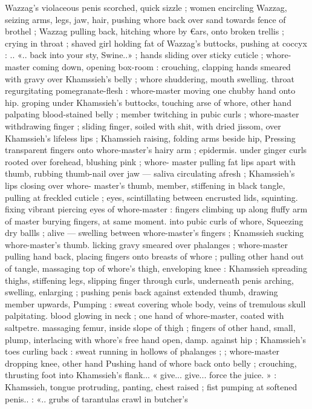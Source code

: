 Wazzag's violaceous penis scorched, quick sizzle ; women encircling
Wazzag, seizing arms, legs, jaw, hair, pushing whore back over sand
towards fence of brothel ; Wazzag pulling back, hitching whore by
€ars, onto broken trellis ; crying in throat ; shaved girl holding fat of
Wazzag's buttocks, pushing at coccyx : .. «.. back into your sty,
Swine..» ; hands sliding over sticky cuticle ; whore-master coming
down, opening box-room : crouching, clapping hands smeared with
gravy over Khamssieh's belly ; whore shuddering, mouth swelling.
throat regurgitating pomegranate-flesh : whore-master moving one
chubby hand onto hip. groping under Khamssieh’s buttocks, touching
arse of whore, other hand palpating blood-stained belly ; member
twitching in pubic curls ; whore-master withdrawing finger ; sliding
finger, soiled with shit, with dried jissom, over Khamssieh’s lifeless
lips ; Khamssieh raising, folding arms beside hip, Pressing
transparent fingers onto whore-master's hairy arm ; epidermis.
under ginger curls rooted over forehead, blushing pink ; whore-
master pulling fat lips apart with thumb, rubbing thumb-nail over jaw
--- saliva circulating afresh ; Khamssieh's lips closing over whore-
master's thumb, member, stiffening in black tangle, pulling at
freckled cuticle ; eyes, scintillating between encrusted lids, squinting.
fixing vibrant piercing eyes of whore-master : fingers climbing up
along fluffy arm of master burying fingers, at same moment. into
pubic curls of whore, Squeezing dry ballls ; alive --- swelling between
whore-master's fingers ; Knamssieh sucking whore-master's thumb.
licking gravy smeared over phalanges ; whore-master pulling hand
back, placing fingers onto breasts of whore ; pulling other hand out
of tangle, massaging top of whore's thigh, enveloping knee :
Khamssieh spreading thighs, stiffening legs, slipping finger through
curls, underneath penis arching, swelling, enlarging ; pushing penis
back against extended thumb, drawing member upwards, Pumping :
sweat covering whole body, veins of tremulous skull palpitating.
blood glowing in neck ; one hand of whore-master, coated with
saltpetre. massaging femur, inside slope of thigh ; fingers of other
hand, small, plump, interlacing with whore's free hand open, damp.
against hip ; Khamssieh's toes curling back : sweat running in
hollows of phalanges ; ; whore-master dropping knee, other hand
Pushing hand of whore back onto belly ; crouching, thrusting foot
into Khamssieh's flank... « give... give... force the juice. » :
Khamssieh, tongue protruding, panting, chest raised ; fist pumping
at softened penis.. : «.. grubs of tarantulas crawl in butcher's
